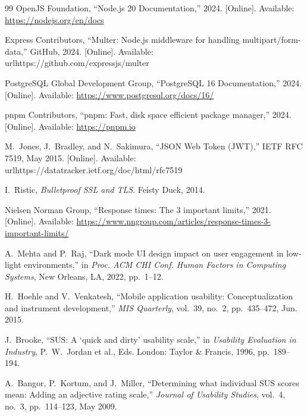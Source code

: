 \documentclass[12pt,a4paper]{article}
\begin{document}
\begin{thebibliography}{99}
OpenJS Foundation, ``Node.js 20 Documentation,'' 2024.
[Online]. Available: \url{https://nodejs.org/en/docs}

Express Contributors, ``Multer: Node.js middleware for
handling multipart/form-data,'' GitHub, 2024.
[Online]. Available: \\url{https://github.com/expressjs/multer}

PostgreSQL Global Development Group,
``PostgreSQL 16 Documentation,'' 2024.
[Online]. Available: \url{https://www.postgresql.org/docs/16/}

pnpm Contributors, ``pnpm: Fast, disk space efficient
package manager,'' 2024.
[Online]. Available: \url{https://pnpm.io}

M.~Jones, J.~Bradley, and N.~Sakimura,
``JSON Web Token (JWT),''
IETF RFC 7519, May 2015.
[Online]. Available: \\url{https://datatracker.ietf.org/doc/html/rfc7519}

I.~Ristic,
\textit{Bulletproof SSL and TLS}.
Feisty Duck, 2014.

Nielsen Norman Group,
``Response times: The 3 important limits,''
2021.
[Online]. Available:
\url{https://www.nngroup.com/articles/response-times-3-important-limits/}

A.~Mehta and P.~Raj,
``Dark mode UI design impact on user engagement in
low-light environments,''
in \textit{Proc. ACM CHI Conf. Human Factors in
Computing Systems}, New Orleans, LA, 2022, pp.~1--12.

H.~Hoehle and V.~Venkatesh,
``Mobile application usability: Conceptualization and
instrument development,''
\textit{MIS Quarterly}, vol.~39, no.~2,
pp.~435--472, Jun. 2015.

J.~Brooke,
``SUS: A `quick and dirty' usability scale,''
in \textit{Usability Evaluation in Industry},
P.~W.~Jordan et al., Eds.
London: Taylor \& Francis, 1996, pp.~189--194.

A.~Bangor, P.~Kortum, and J.~Miller,
``Determining what individual SUS scores mean:
Adding an adjective rating scale,''
\textit{Journal of Usability Studies},
vol.~4, no.~3, pp.~114--123, May 2009.

\end{thebibliography}
\end{document}
